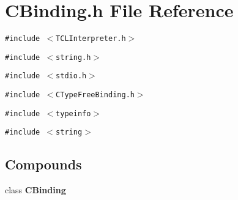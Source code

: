 \section{CBinding.h File Reference}
\label{CBinding_8h}
{\tt \#include $<$TCLInterpreter.h$>$}\par
{\tt \#include $<$string.h$>$}\par
{\tt \#include $<$stdio.h$>$}\par
{\tt \#include $<$CType\-Free\-Binding.h$>$}\par
{\tt \#include $<$typeinfo$>$}\par
{\tt \#include $<$string$>$}\par
\subsection*{Compounds}
\begin{CompactItemize}
\item 
class {\bf CBinding}
\end{CompactItemize}
